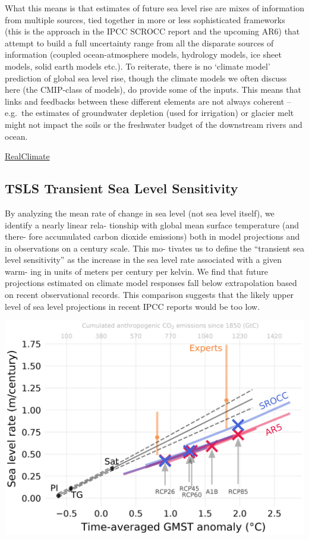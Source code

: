 \documentclass[
]{book}
\begin{document}
What this means is that estimates of future sea level rise are mixes of information from multiple sources, tied together in more or less sophisticated frameworks (this is the approach in the IPCC SCROCC report and the upcoming AR6) that attempt to build a full uncertainty range from all the disparate sources of information (coupled ocean-atmosphere models, hydrology models, ice sheet models, solid earth models etc.). To reiterate, there is no `climate model' prediction of global sea level rise, though the climate models we often discuss here (the CMIP-class of models), do provide some of the inputs. This means that links and feedbacks between these different elements are not always coherent -- e.g.~the estimates of groundwater depletion (used for irrigation) or glacier melt might not impact the soils or the freshwater budget of the downstream rivers and ocean.

\href{https://www.realclimate.org/index.php/archives/2021/05/why-is-future-sea-level-rise-still-so-uncertain/\#.YKyaa3u_nmc.twitter}{RealClimate}

\hypertarget{tsls-transient-sea-level-sensitivity}{%
\subsection{TSLS Transient Sea Level Sensitivity}\label{tsls-transient-sea-level-sensitivity}}

By analyzing the mean rate of change in sea
level (not sea level itself), we identify a nearly linear rela-
tionship with global mean surface temperature (and there-
fore accumulated carbon dioxide emissions) both in model
projections and in observations on a century scale. This mo-
tivates us to define the ``transient sea level sensitivity'' as the
increase in the sea level rate associated with a given warm-
ing in units of meters per century per kelvin. We find that
future projections estimated on climate model responses fall
below extrapolation based on recent observational records.
This comparison suggests that the likely upper level of sea
level projections in recent IPCC reports would be too low.

\includegraphics{fig/Transient_Sea_Level_Sensitivity.png}
\end{document}

